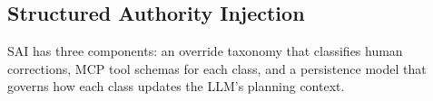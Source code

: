 \subsection{Structured Authority Injection}

SAI has three components: an override taxonomy that classifies human corrections, MCP tool schemas for each class, and a persistence model that governs how each class updates the LLM's planning context.